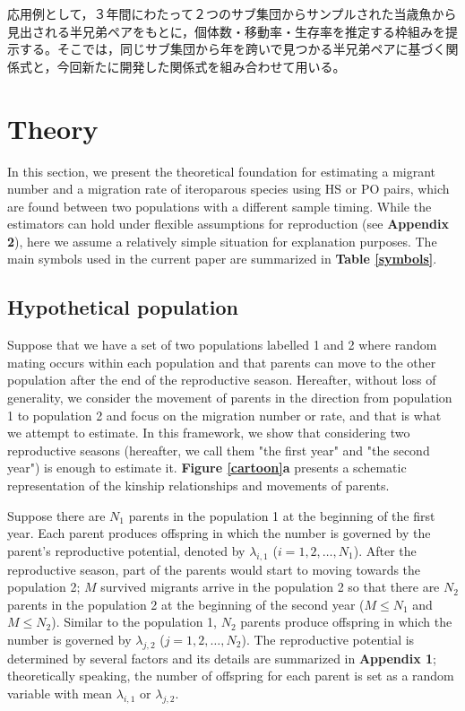 \documentclass[12pt, English]{article}
\begin{document}
\begin{spacing}{1.9}
応用例として，３年間にわたって２つのサブ集団からサンプルされた当歳魚から見出される半兄弟ペアをもとに，個体数・移動率・生存率を推定する枠組みを提示する。そこでは，同じサブ集団から年を跨いで見つかる半兄弟ペアに基づく関係式と，今回新たに開発した関係式を組み合わせて用いる。

\section{Theory}\label{sec2}
In this section, we present the theoretical foundation for estimating a migrant number and a migration rate of iteroparous species using HS or PO pairs, which are found between two populations with a different sample timing. While the estimators can hold under flexible assumptions for reproduction (see {\bf Appendix 2}), here we assume a relatively simple situation for explanation purposes. The main symbols used in the current paper are summarized in {\bf Table \ref{symbols}}. 

\begin{center}
\end{center}

\subsection{Hypothetical population}

Suppose that we have a set of two populations labelled 1 and 2 where random mating occurs within each population and that parents can move to the other population after the end of the reproductive season. Hereafter, without loss of generality, we consider the movement of parents in the direction from population 1 to population 2 and focus on the migration number or rate, and that is what we attempt to estimate. In this framework, we show that considering two reproductive seasons (hereafter, we call them "the first year" and "the second year") is enough to estimate it. {\bf Figure \ref{cartoon}a} presents a schematic representation of the kinship relationships and movements of parents. 

Suppose there are $N_1$ parents in the population 1 at the beginning of the first year. Each parent produces offspring in which the number is governed by the parent's reproductive potential, denoted by $\lambda_{i,1}$ ($i=1,2,\ldots,N_1$). After the reproductive season, part of the parents would start to moving towards the population 2; $M$ survived migrants arrive in the population 2 so that there are $N_2$ parents in the population 2 at the beginning of the second year ($M \le N_1$ and $M \le N_2$). Similar to the population 1, $N_2$ parents produce offspring in which the number is governed by $\lambda_{j,2}$ ($j=1,2,\ldots,N_2$). The reproductive potential is determined by several factors and its details are summarized in {\bf Appendix 1}; theoretically speaking, the number of offspring for each parent is set as a random variable with mean $\lambda_{i,1}$ or $\lambda_{j,2}$. 


\end{spacing}
\end{document}
